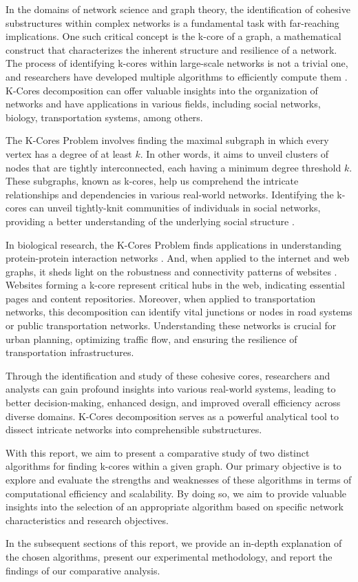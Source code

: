 \label{sec:Introduction}

In the domains of network science and graph theory, the identification of cohesive substructures within complex networks is a fundamental task with far-reaching implications. One such critical concept is the k-core of a graph, a mathematical construct that characterizes the inherent structure and resilience of a network. The process of identifying k-cores within large-scale networks is not a trivial one, and researchers have developed multiple algorithms to efficiently compute them \cite{9622845}. K-Cores decomposition can offer valuable insights into the organization of networks and have applications in various fields, including social networks, biology, transportation systems, among others.

The K-Cores Problem involves finding the maximal subgraph in which every vertex has a degree of at least \(k\). In other words, it aims to unveil clusters of nodes that are tightly interconnected, each having a minimum degree threshold \(k\). These subgraphs, known as k-cores, help us comprehend the intricate relationships and dependencies in various real-world networks. Identifying the k-cores can unveil tightly-knit communities of individuals in social networks, providing a better understanding of the underlying social structure \cite{dey2020network}.

In biological research, the K-Cores Problem finds applications in understanding protein-protein interaction networks \cite{Amin_2003}. And, when applied to the internet and web graphs, it sheds light on the robustness and connectivity patterns of websites \cite{Hamelin_2006}. Websites forming a k-core represent critical hubs in the web, indicating essential pages and content repositories.  Moreover, when applied to transportation networks, this decomposition can identify vital junctions or nodes in road systems or public transportation networks. Understanding these networks is crucial for urban planning, optimizing traffic flow, and ensuring the resilience of transportation infrastructures.

Through the identification and study of these cohesive cores, researchers and analysts can gain profound insights into various real-world systems, leading to better decision-making, enhanced design, and improved overall efficiency across diverse domains. K-Cores decomposition serves as a powerful analytical tool to dissect intricate networks into comprehensible substructures. 

With this report, we aim to present a comparative study of two distinct algorithms for finding k-cores within a given graph. Our primary objective is to explore and evaluate the strengths and weaknesses of these algorithms in terms of computational efficiency and scalability. By doing so, we aim to provide valuable insights into the selection of an appropriate algorithm based on specific network characteristics and research objectives. 

In the subsequent sections of this report, we provide an in-depth explanation of the chosen algorithms, present our experimental methodology, and report the findings of our comparative analysis.